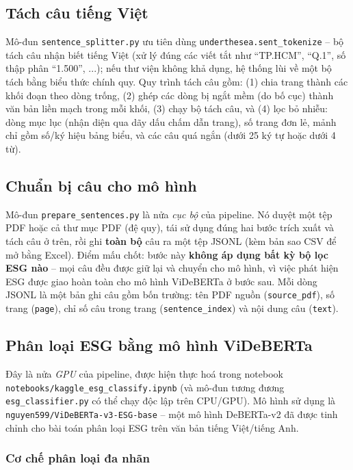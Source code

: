 \documentclass{article}
\begin{document}
\subsection{Tách câu tiếng Việt}

Mô-đun \texttt{sentence\_splitter.py} ưu tiên dùng \texttt{underthesea.sent\_tokenize}
-- bộ tách câu nhận biết tiếng Việt (xử lý đúng các viết tắt như ``TP.HCM'',
``Q.1'', số thập phân ``1.500'', ...); nếu thư viện không khả dụng, hệ thống lùi
về một bộ tách bằng biểu thức chính quy. Quy trình tách câu gồm: (1) chia trang
thành các khối đoạn theo dòng trống, (2) ghép các dòng bị ngắt mềm (do bố cục)
thành văn bản liền mạch trong mỗi khối, (3) chạy bộ tách câu, và (4) lọc bỏ
nhiễu: dòng mục lục (nhận diện qua dãy dấu chấm dẫn trang), số trang đơn lẻ, mảnh
chỉ gồm số/ký hiệu bảng biểu, và các câu quá ngắn (dưới 25 ký tự hoặc dưới 4 từ).

\subsection{Chuẩn bị câu cho mô hình}

Mô-đun \texttt{prepare\_sentences.py} là nửa \textit{cục bộ} của pipeline. Nó duyệt
một tệp PDF hoặc cả thư mục PDF (đệ quy), tái sử dụng đúng hai bước trích xuất và
tách câu ở trên, rồi ghi \textbf{toàn bộ} câu ra một tệp JSONL (kèm bản sao CSV để
mở bằng Excel). Điểm mấu chốt: bước này \textbf{không áp dụng bất kỳ bộ lọc ESG
nào} -- mọi câu đều được giữ lại và chuyển cho mô hình, vì việc phát hiện ESG được
giao hoàn toàn cho mô hình ViDeBERTa ở bước sau. Mỗi dòng JSONL là một bản ghi câu
gồm bốn trường: tên PDF nguồn (\texttt{source\_pdf}), số trang (\texttt{page}),
chỉ số câu trong trang (\texttt{sentence\_index}) và nội dung câu (\texttt{text}).

\subsection{Phân loại ESG bằng mô hình ViDeBERTa}

Đây là nửa \textit{GPU} của pipeline, được hiện thực hoá trong notebook
\texttt{notebooks/kaggle\_esg\_classify.ipynb} (và mô-đun tương đương
\texttt{esg\_classifier.py} có thể chạy độc lập trên CPU/GPU). Mô hình sử dụng là
\texttt{nguyen599/ViDeBERTa-v3-ESG-base} -- một mô hình DeBERTa-v2 đã được tinh
chỉnh cho bài toán phân loại ESG trên văn bản tiếng Việt/tiếng Anh.

\subsubsection{Cơ chế phân loại đa nhãn}
\end{document}
